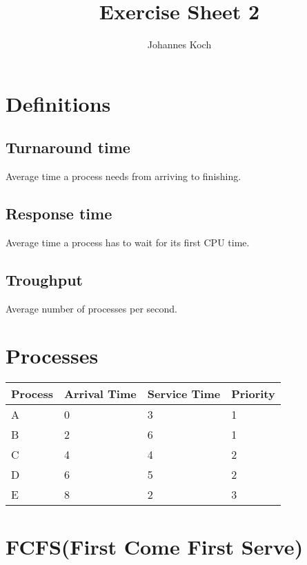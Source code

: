 \documentclass[11pt]{article} %
\title{Exercise Sheet 2}
\author{Johannes Koch}
\begin{document}
\maketitle

\section{Definitions}

\subsection{Turnaround time}
Average time a process needs from arriving to finishing.

\subsection{Response time}
Average time a process has to wait for its first CPU time.

\subsection{Troughput}
Average number of processes per second.

\section{Processes}

\begin{center}
  \begin{tabular}{|p{2cm}|p{2cm}|p{2cm}|p{2cm}|}
    \hline
    \textbf{Process} & \textbf{Arrival Time} & \textbf{Service Time} & \textbf{Priority}\\
    \hline
    A & 0 & 3 & 1\\
    B & 2 & 6 & 1\\
    C & 4 & 4 & 2\\
    D & 6 & 5 & 2\\
    E & 8 & 2 & 3\\
    \hline
  \end{tabular}
\end{center}

\section{FCFS(First Come First Serve)}
\end{document}
